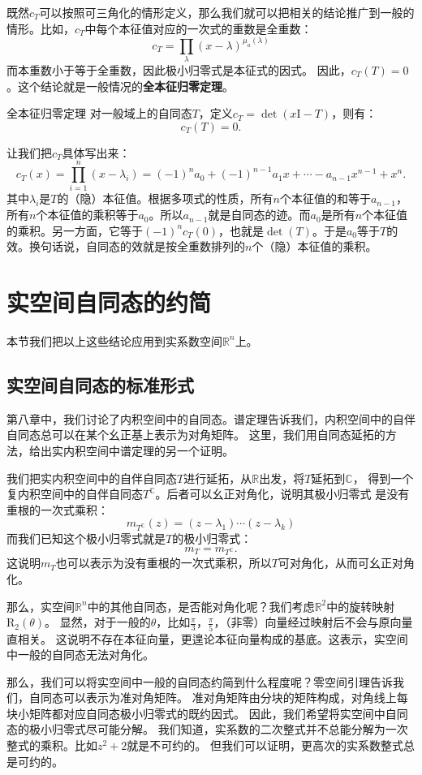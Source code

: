\documentclass[12pt,UTF8]{ctexbook}
\begin{document}
既然$c_T$可以按照可三角化的情形定义，那么我们就可以把相关的结论推广到一般的情形。比如，$c_T$中每个本征值对应的一次式的重数是全重数：
$$
c_T = \prod_{\lambda} (x - \lambda)^{\mu_a(\lambda)}
$$
而本重数小于等于全重数，因此极小归零式是本征式的因式。
因此，$c_T(T) = 0$。这个结论就是一般情况的\textbf{全本征归零定理}。
\begin{tm}{全本征归零定理}
    对一般域上的自同态$T$，定义$c_T = \det(x\mathrm{I} - T)$，则有：
    $$ c_T(T) = 0.$$
\end{tm}

让我们把$c_T$具体写出来：
$$c_T(x) = \prod_{i=1}^n (x - \lambda_i) = (-1)^n a_0 + (-1)^{n-1} a_1 x + \cdots - a_{n-1}x^{n-1} + x^n.$$
其中$\lambda_i$是$T$的（隐）本征值。根据多项式的性质，所有$n$个本征值的和等于$a_{n-1}$，所有$n$个本征值的乘积等于$a_0$。所以$a_{n-1}$就是自同态的迹。而$a_0$是所有$n$个本征值的乘积。另一方面，它等于$(-1)^nc_T(0)$，也就是$\det(T)$。于是$a_0$等于$T$的效。换句话说，自同态的效就是按全重数排列的$n$个（隐）本征值的乘积。

\section{实空间自同态的约简}
本节我们把以上这些结论应用到实系数空间$\mathbb{R}^n$上。

\subsection{实空间自同态的标准形式}
第八章中，我们讨论了内积空间中的自同态。谱定理告诉我们，内积空间中的自伴自同态总可以在某个幺正基上表示为对角矩阵。
这里，我们用自同态延拓的方法，给出实内积空间中谱定理的另一个证明。

我们把实内积空间中的自伴自同态$T$进行延拓，从$\mathbb{R}$出发，将$T$延拓到$\mathbb{C}$，
得到一个复内积空间中的自伴自同态$T^{\mathbb{C}}$。后者可以幺正对角化，说明其极小归零式
是没有重根的一次式乘积：
$$m_{T^{\mathbb{C}}}(z) = (z -\lambda_1)\cdots(z - \lambda_k)$$
而我们已知这个极小归零式就是$T$的极小归零式：
$$m_T = m_{T^{\mathbb{C}}}.$$
这说明$m_T$也可以表示为没有重根的一次式乘积，所以$T$可对角化，从而可幺正对角化。

那么，实空间$\mathbb{R}^n$中的其他自同态，是否能对角化呢？我们考虑$\mathbb{R}^2$中的旋转映射$\mathrm{R}_2(\theta)$。
显然，对于一般的$\theta$，比如$\frac{\pi}{3}$，$\frac{\pi}{5}$，（非零）向量经过映射后不会与原向量直相关。
这说明不存在本征向量，更遑论本征向量构成的基底。这表示，实空间中一般的自同态无法对角化。

那么，我们可以将实空间中一般的自同态约简到什么程度呢？零空间引理告诉我们，自同态可以表示为准对角矩阵。
准对角矩阵由分块的矩阵构成，对角线上每块小矩阵都对应自同态极小归零式的既约因式。
因此，我们希望将实空间中自同态的极小归零式尽可能分解。
我们知道，实系数的二次整式并不总能分解为一次整式的乘积。比如$z^2+2$就是不可约的。
但我们可以证明，更高次的实系数整式总是可约的。
\end{document}
